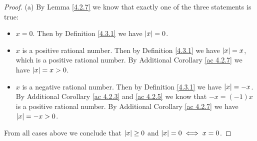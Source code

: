 \begin{proof}{(a)}
    By Lemma \ref{4.2.7} we know that exactly one of the three statements is true:
    \begin{itemize}
        \item \(x = 0\).
              Then by Definition \ref{4.3.1} we have \(\left\lvert x\right\rvert = 0\).
        \item \(x\) is a positive rational number.
              Then by Definition \ref{4.3.1} we have \(\left\lvert x\right\rvert = x\), which is a positive rational number.
              By Additional Corollary \ref{ac 4.2.7} we have \(\left\lvert x\right\rvert = x > 0\).
        \item \(x\) is a negative rational number.
              Then by Definition \ref{4.3.1} we have \(\left\lvert x\right\rvert = -x\).
              By Additional Corollary \ref{ac 4.2.3} and \ref{ac 4.2.5} we know that \(-x = (-1)x\) is a positive rational number.
              By Additional Corollary \ref{ac 4.2.7} we have \(\left\lvert x\right\rvert = -x > 0\).
    \end{itemize}
    From all cases above we conclude that \(\left\lvert x\right\rvert \geq 0\) and \(\left\lvert x\right\rvert = 0 \iff x = 0\).
\end{proof}

